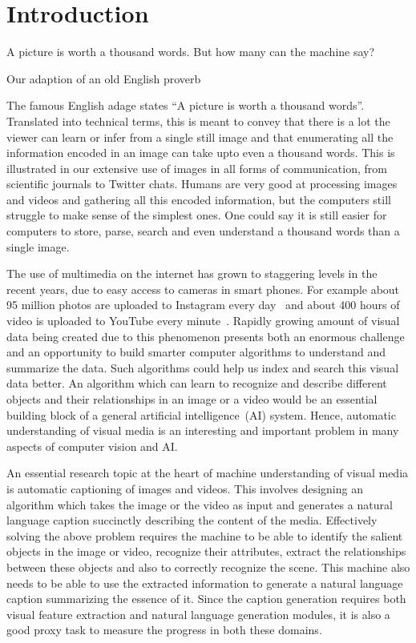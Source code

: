 \chapter{Introduction}
\label{chapter:intro}
\setlength{\epigraphwidth}{\textwidth}
\epigraph{A picture is worth a thousand words. But how many can the machine
say?}{Our adaption of an old English proverb}

The famous English adage states ``A picture is worth a thousand
words''.
Translated into technical terms, this is meant to convey that there is a lot the
viewer can learn or infer from a single still image and that enumerating all the
information encoded in an image can take upto even a thousand words.
This is illustrated in our extensive use of images in all forms of
communication, from scientific journals to Twitter chats. 
%
Humans are very good at processing images and videos and gathering all this
encoded information, but the computers still struggle to make sense of the
simplest ones.
%
One could say it is still easier for computers to store, parse, search and even
understand a thousand words than a single image.
%

The use of multimedia on the internet has grown to staggering levels in the
recent years, due to easy access to cameras in smart phones.
For example about 95 million photos are uploaded to Instagram every
day~\cite{InstStats} and about 400 hours of video is uploaded to YouTube every
minute~\cite{YouStats}.
%
Rapidly growing amount of visual data being created due to this phenomenon
presents both an enormous challenge and an opportunity to build smarter
computer algorithms to understand and summarize the data.
Such algorithms could help us index and search this visual data better.
An algorithm which can learn to recognize and describe different objects and
their relationships in an image or a video would be an essential building block
of a general artificial intelligence~(AI) system.
Hence, automatic understanding of visual media is an interesting and important
problem in many aspects of computer vision and AI.
%

An essential research topic at the heart of machine understanding of visual
media is automatic captioning of images and videos.
This involves designing an algorithm which takes the image or the video as
input and generates a natural language caption succinctly describing the
content of the media.
Effectively solving the above problem requires the machine to be able to
identify the salient objects in the image or video, recognize their attributes,
extract the relationships between these objects and also to correctly recognize
the scene.
This machine also needs to be able to use the extracted information to generate
a natural language caption summarizing the essence of it.
Since the caption generation requires both visual feature extraction and
natural language generation modules, it is also a good proxy task to measure
the progress in both these domains. 

